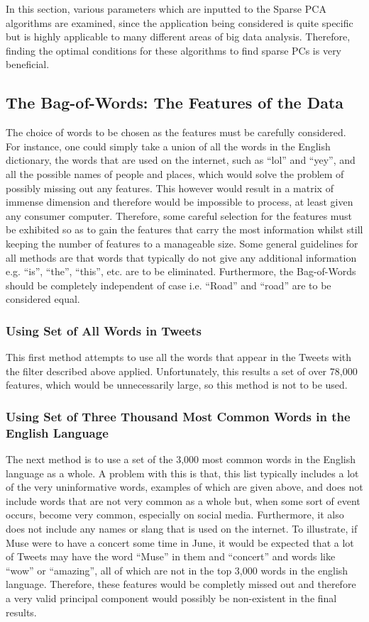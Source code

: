 \documentclass[11pt,a4paper]{article}
\begin{document}
In this section, various parameters which are inputted to the Sparse PCA algorithms are examined, since the application being considered is quite specific but is highly applicable to many different areas of big data analysis. Therefore, finding the optimal conditions for these algorithms to find sparse PCs is very beneficial. 
\subsection{The Bag-of-Words: The Features of the Data}
The choice of words to be chosen as the features must be carefully considered. For instance, one could simply take a union of all the words in the English dictionary, the words that are used on the internet, such as ``lol'' and ``yey'', and all the possible names of people and places, which would solve the problem of possibly missing out any features. This however would result in a matrix of immense dimension and therefore would be impossible to process, at least given any consumer computer. Therefore, some careful selection for the features must be exhibited so as to gain the features that carry the most information whilst still keeping the number of features to a manageable size. Some general guidelines for all methods are that words that typically do not give any additional information e.g. ``is'', ``the'', ``this'', etc. are to be eliminated. Furthermore, the Bag-of-Words should be completely independent of case i.e. ``Road'' and ``road'' are to be considered equal. 

\subsubsection{Using Set of All Words in Tweets}
This first method attempts to use all the words that appear in the Tweets with the filter described above applied. Unfortunately, this results a set of over 78,000 features, which would be unnecessarily large, so this method is not to be used. 

\subsubsection{Using Set of Three Thousand Most Common Words in the English Language}
The next method is to use a set of the 3,000 most common words in the English language as a whole. A problem with this is that, this list typically includes a lot of the very uninformative words, examples of which are given above, and does not include words that are not very common as a whole but, when some sort of event occurs, become very common, especially on social media. Furthermore, it also does not include any names or slang that is used on the internet. To illustrate, if Muse were to have a concert some time in June, it would be expected that a lot of Tweets may have the word ``Muse'' in them and ``concert'' and words like ``wow'' or ``amazing'', all of which are not in the top 3,000 words in the english language. Therefore, these features would be completly missed out and therefore a very valid principal component would possibly be non-existent in the final results.
\end{document}
